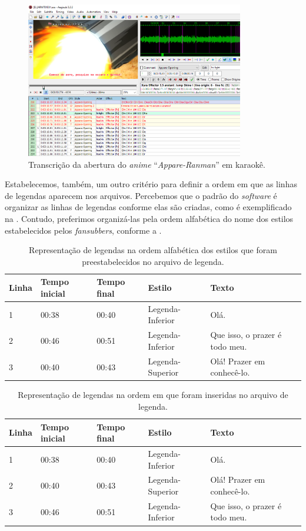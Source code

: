 \documentclass[portuguese]{textolivre}
\begin{document}
\begin{figure}[htbp]
 \centering
 \includegraphics[width=0.85\textwidth]{Fig12.png}
 \caption{Transcrição da abertura do \textit{anime} “\textit{Appare-Ranman}” em karaokê.}
 \label{fig12}
\end{figure}

Estabelecemos, também, um outro critério para definir a ordem em que as linhas de legendas aparecem nos arquivos. Percebemos que o padrão do \textit{software} é organizar as linhas de legendas conforme elas são criadas, como é exemplificado na . Contudo, preferimos organizá-las pela ordem alfabética do nome dos estilos estabelecidos pelos \textit{fansubbers}, conforme a .

\begin{table}[htbp]
\caption{Representação de legendas na ordem alfabética dos estilos que foram preestabelecidos no arquivo de legenda.}
\label{tbl4}
\centering
\begin{tabularx}{\linewidth}{XXXXX}
\toprule
\textbf{Linha} & \textbf{Tempo inicial} & \textbf{Tempo final} & \textbf{Estilo} & \textbf{Texto} \\ 
\midrule
1 & 00:38 & 00:40 & Legenda-Inferior & Olá.
\\ 
2 & 00:46 & 00:51 & Legenda-Inferior & Que isso, o prazer é todo meu.
\\
3 & 00:40 & 00:43 & Legenda-Superior & Olá! Prazer em conhecê-lo.
\\
\bottomrule
\end{tabularx}
\end{table}

\begin{table}[h!]
\caption{Representação de legendas na ordem em que foram inseridas no arquivo de legenda.}
\label{tbl5}
\centering
\begin{tabularx}{\linewidth}{XXXXX}
\toprule
\textbf{Linha} & \textbf{Tempo inicial} & \textbf{Tempo final} & \textbf{Estilo} & \textbf{Texto} \\ 
\midrule
1 & 00:38 & 00:40 & Legenda-Inferior & Olá.
\\ 
2 & 00:40 & 00:43 & Legenda-Superior & Olá! Prazer em conhecê-lo.
\\
3 & 00:46 & 00:51 & Legenda-Inferior & Que isso, o prazer é todo meu.
\\
\bottomrule
\end{tabularx}
\end{table}
\end{document}
